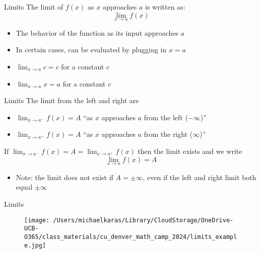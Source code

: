 \documentclass[aspectratio=169]{beamer}
\begin{document}
\begin{frame}{Limits}\label{main1}
	The limit of \( f(x) \) as \( x \) approaches \( a \) is written as:
\[
\lim_{x \to a} f(x)
\]
\begin{itemize}
\begin{itemize}
	\item The behavior of the function as its input approaches \( a \)
	\item In certain cases, can be evaluated by plugging in \( x = a \)
	\item \( \lim_{x \to a} c = c \) for a constant \( c \)
	\item \(\lim_{x \to a} x = a \) for a constant \( c \)
\end{itemize}
\end{itemize}

\end{frame}

\begin{frame}{Limits}\label{main1}
The limit from the left and right are
\begin{itemize}
\begin{itemize}
    \item \(\lim_{x \to a^-} f(x) = A\) “as \(x\) approaches \(a\) from the left (\(-\infty\))”
    \item \(\lim_{x \to a^+} f(x) = A\) “as \(x\) approaches \(a\) from the right (\(\infty\))”
\end{itemize}
\end{itemize}
If \(\lim_{x \to a^-} f(x) = A = \lim_{x \to a^+} f(x)\) then the limit exists and we write
\[
\lim_{x \to a} f(x) = A
\]
\begin{itemize}
    \item Note: the limit does not exist if \(A = \pm\infty\), even if the left and right limit both equal \(\pm\infty\)
\end{itemize}
\end{frame}

\begin{frame}{Limits}\label{main1}
    \begin{figure}
        \centering
        \texttt{[image: /Users/michaelkaras/Library/CloudStorage/OneDrive-UCB-O365/class\_materials/cu\_denver\_math\_camp\_2024/limits\_example.jpg]}
    \end{figure}
\end{frame}
\end{document}
